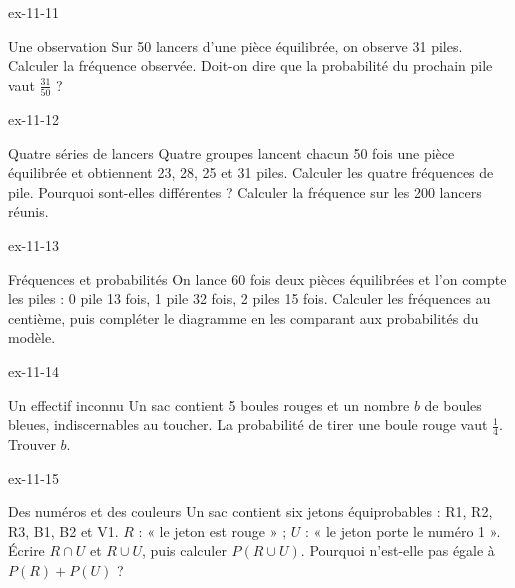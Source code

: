 \begin{blocLivre}{ex-11-11}\begin{exercice}[3]{Une observation}
Sur 50 lancers d’une pièce équilibrée, on observe 31 piles. Calculer la fréquence observée. Doit-on dire que la probabilité du prochain pile vaut $\frac{31}{50}$ ?
\end{exercice}\end{blocLivre}
\begin{blocLivre}{ex-11-12}\begin{exercice}[3]{Quatre séries de lancers}
Quatre groupes lancent chacun 50 fois une pièce équilibrée et obtiennent 23, 28, 25 et 31 piles. Calculer les quatre fréquences de pile. Pourquoi sont-elles différentes ? Calculer la fréquence sur les 200 lancers réunis.
\label{fig-ex-11-12}
\end{exercice}\end{blocLivre}
\begin{blocLivre}{ex-11-13}\begin{exercice}[3]{Fréquences et probabilités}
On lance 60 fois deux pièces équilibrées et l’on compte les piles : 0 pile 13 fois, 1 pile 32 fois, 2 piles 15 fois. Calculer les fréquences au centième, puis compléter le diagramme en les comparant aux probabilités du modèle.
\label{fig-ex-11-13}
\end{exercice}\end{blocLivre}
\begin{blocLivre}{ex-11-14}\begin{exercice}[3]{Un effectif inconnu}
Un sac contient 5 boules rouges et un nombre $b$ de boules bleues, indiscernables au toucher. La probabilité de tirer une boule rouge vaut $\frac14$. Trouver $b$.
\end{exercice}\end{blocLivre}
\begin{blocLivre}{ex-11-15}\begin{exercice}[3]{Des numéros et des couleurs}
Un sac contient six jetons équiprobables : R1, R2, R3, B1, B2 et V1. $R$ : « le jeton est rouge » ; $U$ : « le jeton porte le numéro 1 ». Écrire $R\cap U$ et $R\cup U$, puis calculer $P(R\cup U)$. Pourquoi n’est-elle pas égale à $P(R)+P(U)$ ?
\label{fig-ex-11-15}
\end{exercice}\end{blocLivre}

\clearpage
